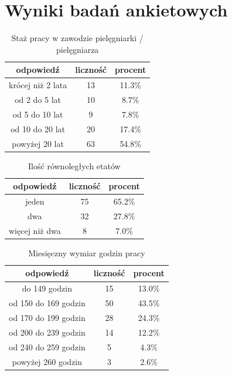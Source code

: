 \documentclass[a4paper,12pt,twoside,openany]{report}
\begin{document}

\chapter{Wyniki badań ankietowych}


\begin{table}[h]
\caption{Staż pracy w zawodzie pielęgniarki / pielęgniarza}
\centering
\begin{tabular}{ | c | c | c |}
\hline
odpowiedź & liczność & procent\\
\hline
krócej niż 2 lata  &  13  & 11.3\% \\
\hline
od 2 do 5 lat  &  10  & 8.7\% \\
\hline
od 5 do 10 lat  &  9  & 7.8\% \\
\hline
od 10 do 20 lat  &  20  & 17.4\% \\
\hline
powyżej 20 lat  &  63  & 54.8\% \\
\hline
\end{tabular}
\label{tab:Q1}
\end{table}



\begin{table}[h]
\caption{Ilość równoległych etatów}
\centering
\begin{tabular}{ | c | c | c |}
\hline
odpowiedź & liczność & procent\\
\hline
jeden  &  75  & 65.2\% \\
\hline
dwa  &  32  & 27.8\% \\
\hline
więcej niż dwa  &  8  & 7.0\% \\
\hline
\end{tabular}
\label{tab:Q2}
\end{table}



\begin{table}[h]
\caption{Miesięczny wymiar godzin pracy}
\centering
\begin{tabular}{ | c | c | c |}
\hline
odpowiedź & liczność & procent\\
\hline
do 149 godzin  &  15  & 13.0\% \\
\hline
od 150 do 169 godzin  &  50  & 43.5\% \\
\hline
od 170 do 199 godzin  &  28  & 24.3\% \\
\hline
od 200 do 239 godzin  &  14  & 12.2\% \\
\hline
od 240 do 259 godzin  &  5  & 4.3\% \\
\hline
powyżej 260 godzin  &  3  & 2.6\% \\
\hline
\end{tabular}
\label{tab:Q3}
\end{table}
\end{document}
